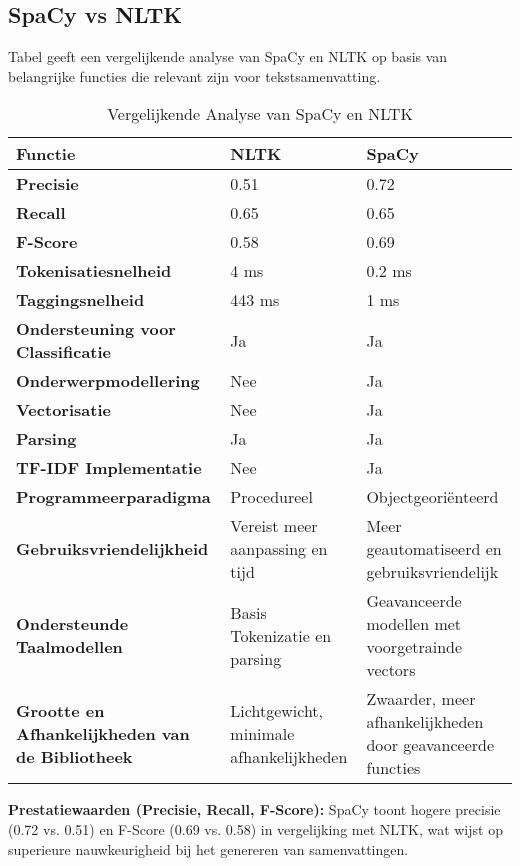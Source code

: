 \subsection{SpaCy vs NLTK}
Tabel geeft een vergelijkende analyse van SpaCy en NLTK op basis van belangrijke functies die relevant zijn voor tekstsamenvatting.
\autocite{amade2024automatic}
\begin{table}[h!]
    \centering
    \begin{tabular}{|p{4cm}|p{5cm}|p{5cm}|}
        \hline
        \textbf{Functie} & \textbf{NLTK} & \textbf{SpaCy} \\ \hline
        \textbf{Precisie} & 0.51 & 0.72 \\ \hline
        \textbf{Recall} & 0.65 & 0.65 \\ \hline
        \textbf{F-Score} & 0.58 & 0.69 \\ \hline
        \textbf{Tokenisatiesnelheid} & 4 ms & 0.2 ms \\ \hline
        \textbf{Taggingsnelheid} & 443 ms & 1 ms \\ \hline
        \textbf{Ondersteuning voor Classificatie} & Ja & Ja \\ \hline
        \textbf{Onderwerpmodellering} & Nee & Ja \\ \hline
        \textbf{Vectorisatie} & Nee & Ja \\ \hline
        \textbf{Parsing} & Ja & Ja \\ \hline
        \textbf{TF-IDF Implementatie} & Nee & Ja \\ \hline
        \textbf{Programmeerparadigma} & Procedureel & Objectgeoriënteerd \\ \hline
        \textbf{Gebruiksvriendelijkheid} & Vereist meer aanpassing en tijd & Meer geautomatiseerd en gebruiksvriendelijk \\ \hline
        \textbf{Ondersteunde Taalmodellen} & Basis Tokenizatie en parsing & Geavanceerde modellen met voorgetrainde vectors \\ \hline
        \textbf{Grootte en Afhankelijkheden van de Bibliotheek} & Lichtgewicht, minimale afhankelijkheden & Zwaarder, meer afhankelijkheden door geavanceerde functies \\ \hline
    \end{tabular}
    \caption{Vergelijkende Analyse van SpaCy en NLTK}
    \label{tab:comparison}
\end{table}


\textbf{Prestatiewaarden (Precisie, Recall, F-Score):} SpaCy toont hogere precisie (0.72 vs. 0.51) en F-Score (0.69 vs. 0.58) in vergelijking met NLTK, wat wijst op superieure nauwkeurigheid bij het genereren van samenvattingen.

